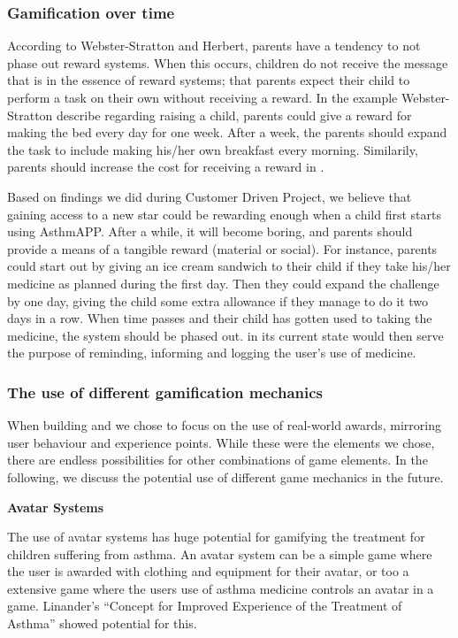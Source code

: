 \subsubsection{Gamification over time}
\label{sec:gamificationovertime}
According to Webster-Stratton and Herbert, parents have a tendency to not phase out reward systems\cite{webster1994troubled}. When this occurs, children do not receive the message that is in the essence of reward systems; that parents expect their child to perform a task on their own without receiving a reward. In the example Webster-Stratton \etal{} describe regarding raising a child, parents could give a reward for making the bed every day for one week. After a week, the parents should expand the task to include making his/her own breakfast every morning. Similarily, parents should increase the cost for receiving a reward in \app{}.  

Based on findings we did during Customer Driven Project\cite{CustomerDriven}, we believe that gaining access to a new star could be rewarding enough when a child first starts using AsthmAPP. After a while, it will become boring, and parents should provide a means of a tangible reward (material or social). For instance, parents could start out by giving an ice cream sandwich to their child if they take his/her medicine as planned during the first day. Then they could expand the challenge by one day, giving the child some extra allowance if they manage to do it two days in a row. When time passes and their child has gotten used to taking the medicine, the system should be phased out. \app{} in its current state would then serve the purpose of reminding, informing and logging the user's use of medicine.

\subsubsection{The use of different gamification mechanics}
\label{sec:gamificationinthefuture}
When building \app{} and \ab{} we chose to focus on the use of real-world awards, mirroring user behaviour and experience points. While these were the elements we chose, there are endless possibilities for other combinations of game elements. In the following, we discuss the potential use of different game mechanics in the future.

\textbf{Avatar Systems}

The use of avatar systems has huge potential for gamifying the treatment for children suffering from asthma. An avatar system can be a simple game where the user is awarded with clothing and equipment for their avatar, or too a extensive game where the users use of asthma medicine controls an avatar in a game. Linander's ``Concept for Improved Experience of the Treatment of Asthma''\cite{linander2013utvikling} showed potential for this.

